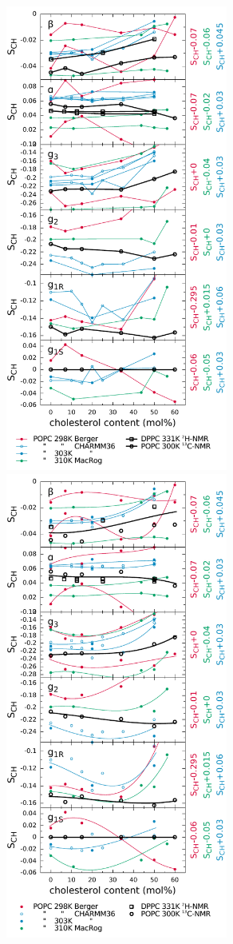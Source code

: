 \documentclass[journal=jacsat,manuscript=article]{achemso}
\begin{document}
\begin{figure}[]
  \centering
  \includegraphics[width=7.3cm]{../DATAreportediINblog/cholesterolization_lp.pdf}
    \includegraphics[width=7.3cm]{../DATAreportediINblog/cholesterolization_smooth.pdf}

\end{figure}
\end{document}
